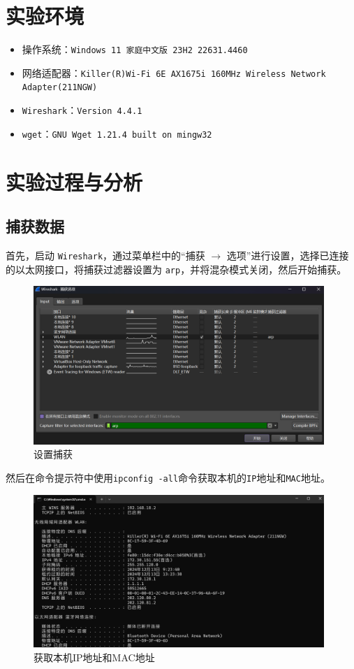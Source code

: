 \documentclass{article}
\begin{document}
	\section{实验环境}
	
	\begin{itemize}[noitemsep]
		\item 操作系统：\texttt{Windows 11 家庭中文版 23H2 22631.4460}
		\item 网络适配器：\texttt{Killer(R)Wi-Fi 6E AX1675i 160MHz Wireless Network Adapter(211NGW)}
		\item \texttt{Wireshark}：\texttt{Version 4.4.1}
		\item \texttt{wget}：\texttt{GNU Wget 1.21.4 built on mingw32}
	\end{itemize}
	
	\section{实验过程与分析}
	
	\subsection{捕获数据}
	
	首先，启动 \texttt{Wireshark}，通过菜单栏中的“捕获 $\to$ 选项”进行设置，选择已连接的以太网接口，将捕获过滤器设置为 \texttt{arp}，并将混杂模式关闭，然后开始捕获。
	
	\begin{figure}[H]
		\centering
		\includegraphics[width=11cm]{images/1.设置捕获.png}
		\caption{设置捕获}
	\end{figure}
	
	然后在命令提示符中使用\texttt{ipconfig -all}命令获取本机的\texttt{IP}地址和\texttt{MAC}地址。
	
	\begin{figure}[H]
		\centering
		\includegraphics[width=11cm]{images/2.获取本机IP地址和MAC地址.png}
		\caption{获取本机IP地址和MAC地址}
	\end{figure}
	
\end{document}
